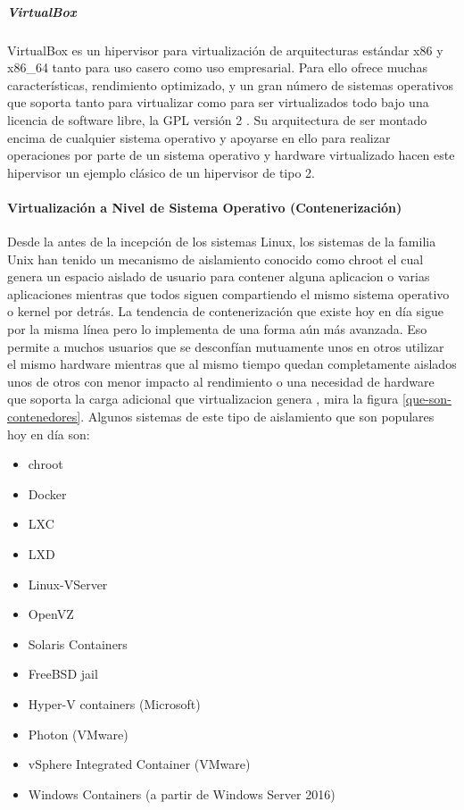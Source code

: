   
\subparagraph{VirtualBox}
VirtualBox es un hipervisor para virtualización de arquitecturas estándar x86 y x86\_64 tanto para uso casero como uso empresarial. Para ello ofrece muchas características, rendimiento optimizado, y un gran número de sistemas operativos que soporta tanto para virtualizar como para ser virtualizados todo bajo una licencia de software libre, la GPL versión 2 \citep{VirtualBox}. Su arquitectura de ser montado encima de cualquier sistema operativo y apoyarse en ello para realizar operaciones por parte de un sistema operativo y hardware virtualizado hacen este hipervisor un ejemplo clásico de un hipervisor de tipo 2.
 

\paragraph{Virtualización a Nivel de Sistema Operativo (Contenerización)}
Desde la antes de la incepción de los sistemas Linux, los sistemas de la familia Unix han tenido un mecanismo de aislamiento conocido como chroot el cual genera un espacio aislado de usuario para contener alguna aplicacion o varias aplicaciones mientras que todos siguen compartiendo el mismo sistema operativo o kernel por detrás. La tendencia de contenerización que existe hoy en día sigue por la misma línea pero lo implementa de una forma aún más avanzada. Eso permite a muchos usuarios que se desconfían mutuamente unos en otros utilizar el mismo hardware mientras que al mismo tiempo quedan completamente aislados unos de otros con menor impacto al rendimiento o una necesidad de hardware que soporta la carga adicional que virtualizacion genera \citep{Teimouri-Davoud-OS-level-virt}, mira la figura \ref{que-son-contenedores}. Algunos sistemas de este tipo de aislamiento que son populares hoy en día son:
\begin{multicols}{3}
  \begin{itemize}
      \item chroot
      \item Docker
      \item LXC
      \item LXD
      \item Linux-VServer
      \item OpenVZ
      \item Solaris Containers
      \item FreeBSD jail
      \item Hyper-V containers (Microsoft)
      \item Photon (VMware)
  \end{itemize}
\end{multicols}
\begin{multicols}{2}
	\begin{itemize}
	    \item vSphere Integrated Container (VMware)
	    \item Windows Containers (a partir de Windows Server 2016)
	\end{itemize}
\end{multicols}
 

